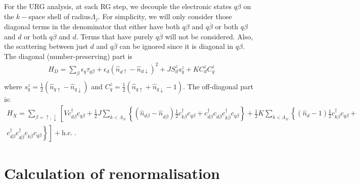 For the URG analysis, at each RG step, we decouple the electronic states \(q\beta\) on the \(k-\)space shell of radius\(\Lambda_j\). For simplicity, we will only consider those diagonal terms in the denominator that either have both \(q\beta\) and \(q\overline\beta\) or  both \(q\beta\) and \(d\) or both \(q\overline\beta\) and \(d\). Terms that have purely \(q\overline\beta\) will not be considered. Also, the scattering between just \(d\) and \(q\overline\beta\) can be ignored since it is diagonal in \(q\beta\). 
The diagonal (number-preserving) part is
\begin{equation}\begin{aligned}
	H_D = \sum_\beta\epsilon_q\tau_{q\beta} + \epsilon_d \left( \hat n_{d \uparrow} - \hat n_{d \downarrow} \right) ^2 + J S^z_ds^z_{q} + K C^z_d C^z_q\\
\end{aligned}\end{equation}
where \(s_q^z = \frac{1}{2}\left(\hat n_{q\uparrow} - \hat n_{q\downarrow}\right)\) and \(C_q^z = \frac{1}{2}\left(\hat n_{q \uparrow} + \hat n_{q \downarrow} - 1\right)\). The off-diagonal part is:
\begin{equation}\begin{aligned}
	H_X = \sum_{\beta=\uparrow,\downarrow}\left[V c^\dagger_{d\beta}c_{q\beta} + \frac{1}{2}J \sum_{k<\Lambda_N}\left\{\left(\hat n_{d \beta} - \hat n_{d \overline\beta}\right) \frac{1}{2} c^\dagger_{k\beta}c_{q\beta} + c^\dagger_{d\beta}c_{d\overline\beta}c^\dagger_{k\overline\beta}c_{q \beta}\right\} + \frac{1}{2}K \sum_{k<\Lambda_N}\left\{\left(\hat n_d -1\right)\frac{1}{2}c^\dagger_{k\beta}c_{q\beta} + \right.\right.\\
\left.\left.c^\dagger_{d\beta}c^\dagger_{d\overline\beta}c_{k\overline\beta}c_{q\beta}\right\}\right] + \text{h.c.}~.
\end{aligned}\end{equation}

\section{Calculation of renormalisation}
